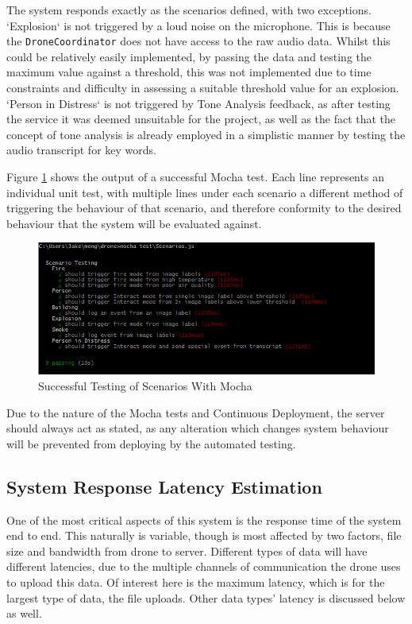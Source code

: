 \documentclass{article}
\begin{document}
The system responds exactly as the scenarios defined, with two exceptions. `Explosion` is not triggered by a loud noise on the microphone. This is because the \texttt{DroneCoordinator} does not have access to the raw audio data. Whilst this could be relatively easily implemented, by passing the data and testing the maximum value against a threshold, this was not implemented due to time constraints and difficulty in assessing a suitable threshold value for an explosion. `Person in Distress` is not triggered by Tone Analysis feedback, as after testing the service it was deemed unsuitable for the project, as well as the fact that the concept of tone analysis is already employed in a simplistic manner by testing the audio transcript for key words.

Figure \ref{fig:MochaScenarios} shows the output of a successful Mocha test. Each line represents an individual unit test, with multiple lines under each scenario a different method of triggering the behaviour of that scenario, and therefore conformity to the desired behaviour that the system will be evaluated against. 

\begin{figure}[h]
\centering
\caption{Successful Testing of Scenarios With Mocha\label{fig:MochaScenarios}}
\includegraphics[width=\textwidth]{MochaScenarios}
\end{figure}

Due to the nature of the Mocha tests and Continuous Deployment, the server should always act as stated, as any alteration which changes system behaviour will be prevented from deploying by the automated testing.



\subsection{System Response Latency Estimation}
One of the most critical aspects of this system is the response time of the system end to end. This naturally is variable, though is most affected by two factors, file size and bandwidth from drone to server. Different types of data will have different latencies, due to the multiple channels of communication the drone uses to upload this data. Of interest here is the maximum latency, which is for the largest type of data, the file uploads. Other data types' latency is discussed below as well.
\end{document}
